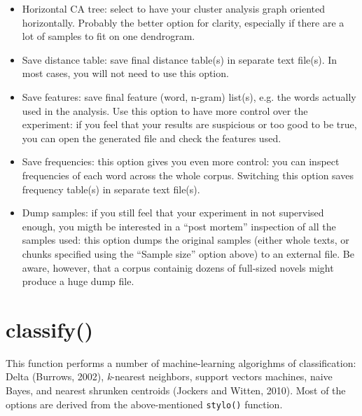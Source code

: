 \documentclass[11pt,a4paper]{article}
\def\margin#1{\marginpar{\textcolor{blue}{\footnotesize\tt #1}}}
\def\code#1{{\tt #1}}
\begin{document}
\begin{itemize}
\item Horizontal CA tree:\margin{dendrogram.lay-\\
out.horizontal=} select to have your cluster analysis graph oriented
horizontally. Probably the better option for clarity, especially if
there are a lot of samples to fit on one dendrogram. 

\item Save distance table:\margin{save.distan-\\
ce.tables=} save final distance table(s) in separate text file(s).
In most cases, you will not need to use this option. 

\item Save features:\margin{save.analy-\\
zed.features=}\margin{TRUE|FALSE} save final feature (word, n-gram) 
list(s), e.g. the words actually used in the analysis. Use this option 
to have more control over the experiment: if you feel that your results 
are suspicious or too good to be true, you can open the generated file 
and check the features used. 

\item Save frequencies:\margin{save.analyzed.freqs=} this option gives
you even more control: you can inspect frequencies of each word across
the whole corpus. Switching this option saves frequency table(s) in
separate text file(s). 

\item Dump samples:\margin{dump.samples=}\margin{TRUE|FALSE} if you
still feel that your experiment in not supervised enough, you migth
be interested in a ``post mortem'' inspection of all the samples used:
this option dumps the original samples (either whole texts, or chunks
specified using the ``Sample size'' option above) to an external file.
Be aware, however, that a corpus containig dozens of full-sized novels
might produce a huge dump file. 
\end{itemize}

\section{classify()}

This function performs a number of machine-learning algorighms of
classification: Delta (Burrows, 2002), \textit{k}-nearest neighbors,
support vectors machines, naive Bayes, and nearest shrunken centroids
(Jockers and Witten, 2010). Most of the options are derived from the
above-mentioned \code{stylo()} function.
\end{document}

